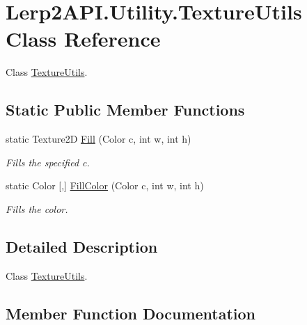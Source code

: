 \hypertarget{class_lerp2_a_p_i_1_1_utility_1_1_texture_utils}{}\section{Lerp2\+A\+P\+I.\+Utility.\+Texture\+Utils Class Reference}
\label{class_lerp2_a_p_i_1_1_utility_1_1_texture_utils}


Class \hyperlink{class_lerp2_a_p_i_1_1_utility_1_1_texture_utils}{Texture\+Utils}.  


\subsection*{Static Public Member Functions}
\begin{DoxyCompactItemize}
\item 
static Texture2D \hyperlink{class_lerp2_a_p_i_1_1_utility_1_1_texture_utils_a022fee05fce5d493f8cec2a49d1b6a89}{Fill} (Color c, int w, int h)
\begin{DoxyCompactList}\small\item\em Fills the specified c. \end{DoxyCompactList}\item 
static Color \mbox{[},\mbox{]} \hyperlink{class_lerp2_a_p_i_1_1_utility_1_1_texture_utils_a2526ea7dc2a06b4d8eb78eeb6521de15}{Fill\+Color} (Color c, int w, int h)
\begin{DoxyCompactList}\small\item\em Fills the color. \end{DoxyCompactList}\end{DoxyCompactItemize}


\subsection{Detailed Description}
Class \hyperlink{class_lerp2_a_p_i_1_1_utility_1_1_texture_utils}{Texture\+Utils}. 



\subsection{Member Function Documentation}
\mbox{\label{class_lerp2_a_p_i_1_1_utility_1_1_texture_utils_a022fee05fce5d493f8cec2a49d1b6a89}} 
